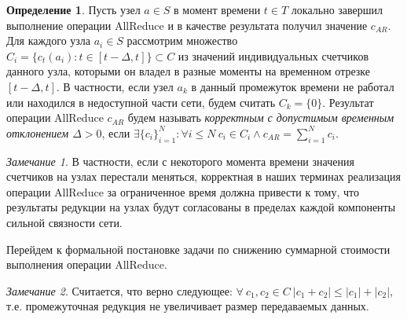 \documentclass{article}
\theoremstyle{plain}
\theoremstyle{plain}
\theoremstyle{plain}
\theoremstyle{plain}
\theoremstyle{definition}
\newtheorem{definition}{Определение}[section]
\theoremstyle{remark}
\newtheorem{remark}{Замечание}[section]
\theoremstyle{plain}
\begin{document}
\begin{definition}
\label{AllReduceСorrectness}
    Пусть узел $a \in S$ в момент времени $t \in T$ локально завершил выполнение операции AllReduce и в качестве результата получил значение $c_{AR}$. Для каждого узла $a_i \in S$ рассмотрим множество $C_i = \{ c_t(a_i) : t \in [t - \Delta, t] \} \subset C$ из значений индивидуальных счетчиков данного узла, которыми он владел в разные моменты на временном отрезке $[t - \Delta, t]$. В частности, если узел $a_k$ в данный промежуток времени не работал или находился в недоступной части сети, будем считать $C_k = \{ 0 \}$. Результат операции AllReduce $c_{AR}$ будем называть \textit{корректным с допустимым временным отклонением $\Delta > 0$}, если $\exists \{ c_i \}_{i = 1}^N : \forall i \leq N\ c_i \in C_i \wedge c_{AR} = \displaystyle \sum_{i = 1}^N c_i$.
\end{definition}

\begin{remark}
    В частности, если с некоторого момента времени значения счетчиков на узлах перестали меняться, корректная в наших терминах реализация операции AllReduce за ограниченное время должна привести к тому, что результаты редукции на узлах будут согласованы в пределах каждой компоненты сильной связности сети.
\end{remark}

Перейдем к формальной постановке задачи по снижению суммарной стоимости выполнения операции AllReduce.

\begin{remark}
\label{ReductionOptimization}
    Считается, что верно следующее: $\forall\ c_1, c_2 \in C\ |c_1 + c_2| \leq |c_1| + |c_2|$, т.е. промежуточная редукция не увеличивает размер передаваемых данных.
\end{remark}
\end{document}
